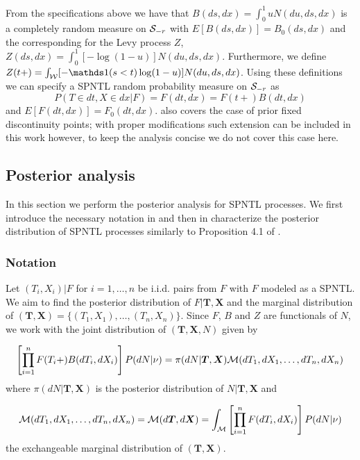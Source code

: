From the specifications above we have that $B(ds, dx) = \int_0^1 uN(du,ds,dx)$ is a completely random measure on $\mathcal{S}_{-r}$ with $E\left[B(ds, dx)\right] = B_0(ds,dx)$ and the corresponding for the Levy process $Z$, $Z(ds, dx) = \int_0^1 [-\log(1-u)]N(du,ds,dx)$. Furthermore, we define $Z(t+) = \int_{\calW}[-\indicator(s < t)\log(1-u)]N(du,ds,dx)$. Using these definitions we can specify a SPNTL random probability measure on $\mathcal{S}_{-r}$ as 
\begin{equation*}
P(T \in dt, X \in dx | F) = F(dt, dx) = F(t+)B(dt, dx)  
\end{equation*}
and $E\left[F(dt, dx)\right] = F_0(dt, dx)$. \cite{james2006poisson} also covers the case of prior fixed discontinuity points; with proper modifications such extension can be included in this work however, to keep the analysis concise we do not cover this case here.

\subsection{Posterior analysis}\label{SPNTL_posterior}
In this section we perform the posterior analysis for SPNTL processes. We first introduce the necessary notation in  and then in  characterize the posterior distribution of SPNTL processes similarly to Proposition 4.1 of \cite{james2006poisson}.

\subsubsection{Notation}\label{notation}
Let $(T_i, X_i)|F$ for $i=1, \ldots, n$ be i.i.d. pairs from $F$ with $F$ modeled as a SPNTL. We aim to find the posterior distribution of $F|\boldsymbol{T}, \boldsymbol{X}$ and the marginal distribution of $(\boldsymbol{T}, \boldsymbol{X}) = \{(T_1, X_1), \ldots, (T_n, X_n)\}$. Since $F$, $B$ and $Z$ are functionals of $N$, we work with the joint distribution of $(\boldsymbol{T}, \boldsymbol{X}, N)$ given by

\begin{equation}\label{joint_dist}
\left[\prod_{i=1}^n F(T_i +) B(dT_i, dX_i)\right]P(dN|\nu) = \pi(dN|\boldsymbol{T}, \boldsymbol{X}) \mathcal{M}(dT_1, dX_1, \ldots, dT_n, dX_n)
\end{equation}
where $\pi(dN|\boldsymbol{T}, \boldsymbol{X})$ is the posterior distribution of $N|\boldsymbol{T}, \boldsymbol{X}$ and 

\begin{equation*}
\mathcal{M}(dT_1, dX_1, \ldots, dT_n, dX_n) = \mathcal{M}(d\boldsymbol{T}, d\boldsymbol{X}) = \int_{\mathcal{M}}\left[\prod_{i=1}^n F(dT_i, dX_i)\right]P(dN|\nu)
\end{equation*}
the exchangeable marginal distribution of $(\boldsymbol{T}, \boldsymbol{X})$.

